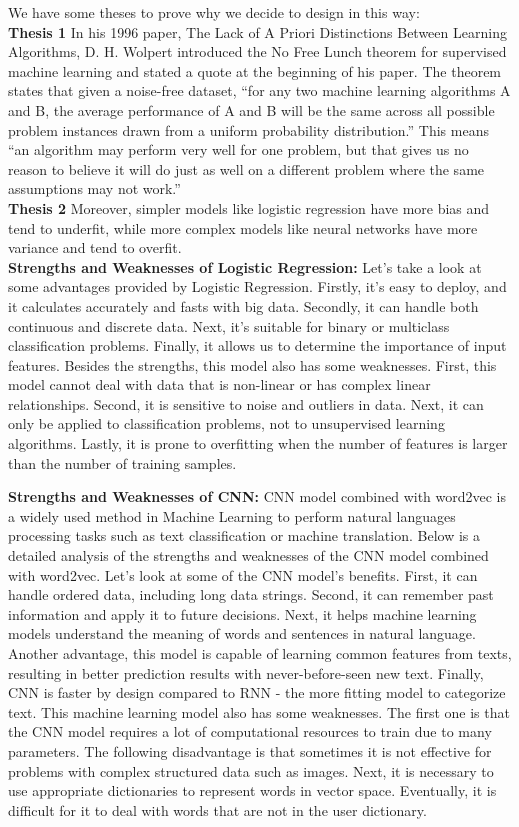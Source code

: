 We have some theses to prove why we decide to design in this way: \\
\textbf{Thesis 1}
In his 1996 paper, The Lack of A Priori Distinctions Between Learning Algorithms, D. H. Wolpert introduced the No Free Lunch theorem for supervised machine learning and stated a quote at the beginning of his paper. The theorem states that given a noise-free dataset, “for any two machine learning algorithms A and B, the average performance of A and B will be the same across all possible problem instances drawn from a uniform probability distribution.” This means  “an algorithm may perform very well for one problem, but that gives us no reason to believe it will do just as well on a different problem where the same assumptions may not work.” \\
\textbf{Thesis 2}
Moreover, simpler models like logistic regression have more bias and tend to underfit, while more complex models like neural networks have more variance and tend to overfit. \\
\textbf{Strengths and Weaknesses of Logistic Regression:} 
Let's take a look at some advantages provided by Logistic Regression. Firstly, it's easy to deploy, and it calculates accurately and fasts with big data. Secondly, it can handle both continuous and discrete data. Next, it's suitable for binary or multiclass classification problems. Finally, it allows us to determine the importance of input features. Besides the strengths, this model also has some weaknesses.
First, this model cannot deal with data that is non-linear or has complex linear relationships. Second, it is sensitive to noise and outliers in data. Next, it can only be applied to classification problems, not to unsupervised learning algorithms. Lastly, it is prone to overfitting when the number of features is larger than the number of training samples.

\textbf{Strengths and Weaknesses of CNN:} 
CNN model combined with word2vec is a widely used method in Machine Learning to perform natural languages processing tasks such as text classification or machine translation. Below is a detailed analysis of the strengths and weaknesses of the CNN model combined with word2vec.
Let's look at some of the CNN model's benefits. First, it can handle ordered data, including long data strings. Second, it can remember past information and apply it to future decisions. Next, it helps machine learning models understand the meaning of words and sentences in natural language. Another advantage, this model is capable of learning common features from texts, resulting in better prediction results with never-before-seen new text. Finally, CNN is faster by design compared to RNN - the more fitting model to categorize text. This machine learning model also has some weaknesses. The first one is that the CNN model requires a lot of computational resources to train due to many parameters. The following disadvantage is that sometimes it is not effective for problems with complex structured data such as images. Next, it is necessary to use appropriate dictionaries to represent words in vector space. Eventually, it is difficult for it to deal with words that are not in the user dictionary. 

